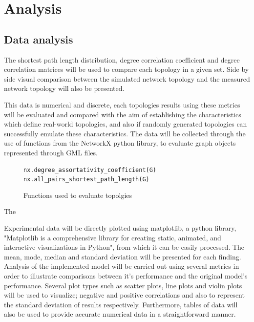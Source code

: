 \section{Analysis}



\subsection{Data analysis}

The shortest path length distribution, degree correlation coefficient and degree correlation matrices will be used to compare each topology in a given set. 
Side by side visual comparison between the simulated network topology and the measured network topology will also be presented. 

This data is numerical and discrete, each topologies results using these metrics will be evaluated and compared with the aim of establishing the characteristics which define real-world topologies, and also if randomly generated topologies can successfully emulate these characteristics. The data will be collected through the use of functions from the NetworkX python library, to evaluate graph objects represented through GML files. 

\begin{figure}
    \centering
    \verb|nx.degree_assortativity_coefficient(G)| \verb|nx.all_pairs_shortest_path_length(G)|
    \caption{Functions used to evaluate topolgies}
    \label{fig:enter-label}
\end{figure}

The 

Experimental data will be directly plotted using matplotlib, a python library, "Matplotlib is a comprehensive library for creating static, animated, and interactive visualizations in Python"\cite{matplotlib},  from which it can be easily processed. The mean, mode, median and standard deviation will be presented for each finding. Analysis of the implemented model will be carried out using several metrics in order to illustrate comparisons between it's performance and the original model's performance. Several plot types such as scatter plots, line plots and violin plots will be used to visualize; negative and positive correlations and also to represent the standard deviation of results respectively. Furthermore, tables of data will also be used to provide accurate numerical data in a straightforward manner.

